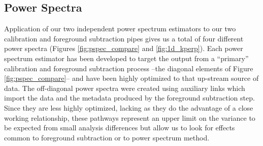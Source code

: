 \documentclass[twolcolumn,iop]{emulateapj}
\begin{document}
%


\subsection{Power Spectra}

Application of our two independent power spectrum estimators to our two calibration and foreground subtraction pipes gives us a total of four different power spectra (Figures \ref{fig:pspec_compare} and \ref{fig:1d_kperp}).  Each power spectrum estimator has been developed to target the output from a ``primary'' calibration and foreground subtraction process --the diagonal elements of Figure \ref{fig:pspec_compare}-- and have been highly optimized to that up-stream source of data.  The off-diagonal power spectra were created using auxiliary links which import the data and the metadata produced by the foreground subtraction step.  Since they are less highly optimized, lacking as they do the advantage of a close working relationship, these pathways represent an upper limit on the variance to be expected from small analysis differences but allow us to look for effects common to foreground subtraction or to power spectrum method.
\end{document}

